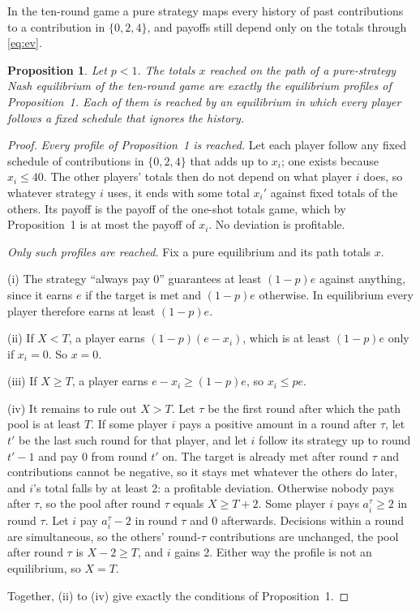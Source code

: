 \documentclass[10pt]{article}
\newtheorem{lemma}{Proposition}
\begin{document}
In the ten-round game a pure strategy maps every history of past contributions to a contribution in $\{0,2,4\}$, and payoffs still depend only on the totals through \eqref{eq:ev}.

\begin{lemma}
\label{prop:repeated}
Let $p<1$. The totals $x$ reached on the path of a pure-strategy Nash equilibrium of the ten-round game are exactly the equilibrium profiles of Proposition~1. Each of them is reached by an equilibrium in which every player follows a fixed schedule that ignores the history.
\end{lemma}

\begin{proof}
\emph{Every profile of Proposition~1 is reached.} Let each player follow any fixed schedule of contributions in $\{0,2,4\}$ that adds up to $x_i$; one exists because $x_i\le40$. The other players' totals then do not depend on what player $i$ does, so whatever strategy $i$ uses, it ends with some total $x_i'$ against fixed totals of the others. Its payoff is the payoff of the one-shot totals game, which by Proposition~1 is at most the payoff of $x_i$. No deviation is profitable.

\emph{Only such profiles are reached.} Fix a pure equilibrium and its path totals $x$.

(i) The strategy ``always pay 0'' guarantees at least $(1-p)e$ against anything, since it earns $e$ if the target is met and $(1-p)e$ otherwise. In equilibrium every player therefore earns at least $(1-p)e$.

(ii) If $X<T$, a player earns $(1-p)(e-x_i)$, which is at least $(1-p)e$ only if $x_i=0$. So $x=0$.

(iii) If $X\ge T$, a player earns $e-x_i\ge(1-p)e$, so $x_i\le pe$.

(iv) It remains to rule out $X>T$. Let $\tau$ be the first round after which the path pool is at least $T$. If some player $i$ pays a positive amount in a round after $\tau$, let $t'$ be the last such round for that player, and let $i$ follow its strategy up to round $t'-1$ and pay 0 from round $t'$ on. The target is already met after round $\tau$ and contributions cannot be negative, so it stays met whatever the others do later, and $i$'s total falls by at least 2: a profitable deviation. Otherwise nobody pays after $\tau$, so the pool after round $\tau$ equals $X\ge T+2$. Some player $i$ pays $a_i^\tau\ge2$ in round $\tau$. Let $i$ pay $a_i^\tau-2$ in round $\tau$ and 0 afterwards. Decisions within a round are simultaneous, so the others' round-$\tau$ contributions are unchanged, the pool after round $\tau$ is $X-2\ge T$, and $i$ gains 2. Either way the profile is not an equilibrium, so $X=T$.

Together, (ii) to (iv) give exactly the conditions of Proposition~1.
\end{proof}
\end{document}
